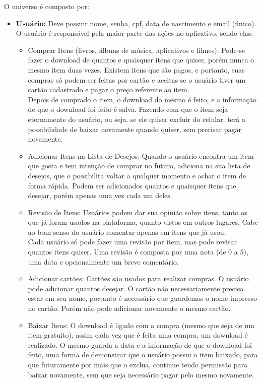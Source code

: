 \documentclass[a4paper, 11pt]{article}
\begin{document}
O universo é composto por:
\begin{itemize}
    \item \textbf{Usuário:} Deve possuir nome, senha, cpf, data de nascimento e email (único). O usuário é responsável pela maior parte das ações no aplicativo, sendo elas:
    \begin{itemize}
        \item Comprar Itens (livros, álbuns de música, aplicativos e filmes): Pode-se fazer o download de quantos e quaisquer itens que quiser, porém nunca o mesmo item duas vezes. Existem itens que são pagos, e portanto, suas compras só podem ser feitas por cartão e aceitas se o usuário tiver um cartão cadastrado e pagar o preço referente ao item.\\
        Depois de comprado o item, o download do mesmo é feito, e a informação de que o download foi feito é salva. Fazendo com
        que o item seja eternamente do usuário, ou seja, se ele quiser excluir do celular, terá a possibilidade de baixar novamente quando quiser, sem precisar pagar novamente.
        \\
        \item Adicionar Itens na Lista de Desejos: Quando o usuário encontra um item que gosta e tem intenção de comprar no futuro, adiciona na sua lista de desejos, que o possibilita voltar a qualquer momento e achar o item de forma rápida. Podem ser adicionados quantos e quaisquer itens que desejar, porém apenas uma vez cada um deles.
        \\
        \item Revisão de Itens: Usuários podem dar sua opinião sobre itens, tanto os que já foram usados na plataforma, quanto vistos em outros lugares. Cabe ao bom senso do usuário comentar apenas em itens que já usou. \\
        Cada usuário só pode fazer uma revisão por item, mas pode revisar quantos itens quiser. Uma revisão é composta por uma nota (de 0 a 5), uma data e opcionalmente um breve comentário.
        \\
        \item Adicionar cartões: Cartões são usados para realizar compras. O usuário pode adicionar quantos desejar. O cartão não necessariamente precisa estar em seu nome, portanto é necessário que guardemos o nome impresso no cartão. Porém não pode adicionar novamente o mesmo cartão.
        \\
        \item Baixar Itens: O download é ligado com a compra (mesmo que seja de um item gratuito), assim cada vez que é feita uma compra, um download é realizado. O mesmo guarda a data e a informação de que o download foi feito, uma forma de demonstrar que o usuário possui o item baixado, para que futuramente por mais que o exclua, continue tendo permissão para baixar novamente, sem que seja necessário pagar pelo mesmo novamente.

\end{itemize}
\end{itemize}
\end{document}
